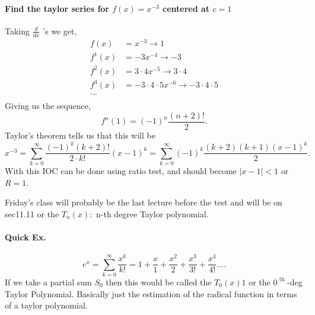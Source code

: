 \begin{exampleblock}{}
\paragraph{Find the taylor series for $ f\left( x \right) =x^{ -3 } $ centered at $ c=1 $}
Taking $ \frac{ d }{ dx }  $ 's we get,
\begin{align*}
	f\left( x \right) &= x^{ -3 } \to 1\\
	f^{ 1 }\left( x \right) &= -3x^{ -4 } \to -3 \\
	f^{ 2 }\left( x \right) &= 3\cdot 4 x^{ -5 } \to 3\cdot 4\\
	f^{ 3 }\left( x \right) &= -3\cdot 4\cdot 5 x^{ -6 } \to -3\cdot 4\cdot 5\\
	\ldots \\
\end{align*}
Giving us the sequence,
\[
f^{ n }\left( 1 \right) =\left( -1 \right) ^{ n }\frac{ \left( n+2 \right) ! }{ 2 }
.\] 
Taylor's theorem tells us that this will be
\[
x^{ -3 }= \sum_{k=0}^{\infty} \frac{ \left( -1 \right) ^{ k }\left( k+2 \right) ! }{ 2\cdot k! }\left( x-1 \right) ^{ k } = \sum_{ k=0 } ^{ \infty } \left( -1 \right) ^{ k } \frac{ \left( k+2 \right) \left( k+1 \right) \left( x-1 \right) ^{ k } }{ 2 }
.\] 
With this IOC can be done using ratio test, and should become $ \left| x -1 \right| < 1 $ or $ R=1 $. 
\end{exampleblock}
Friday's class will probably be the last lecture before the test and will be on sec11.11 or the $ T_n\left( x \right) : $ n-th degree Taylor polynomial. 
\paragraph{Quick Ex.}
\[
e^{ x }=\sum_{ k=0 } ^{ \infty } \frac{ x^{ k } }{ k! }= 1 + \frac{ x }{ 1 } +\frac{ x^2 }{ 2 } + \frac{ x^3 }{ 3! }+ \frac{ x^{ 4 } }{ 4! }\ldots
.\] 
If we take a partial sum $ S_0 $ then this would be called the $ T_0\left( x \right) 1 $ or the $ 0^{ \text{ th } } $-deg Taylor Polynomial. Basically just the estimation of the radical function in terms of a taylor polynomial. 
